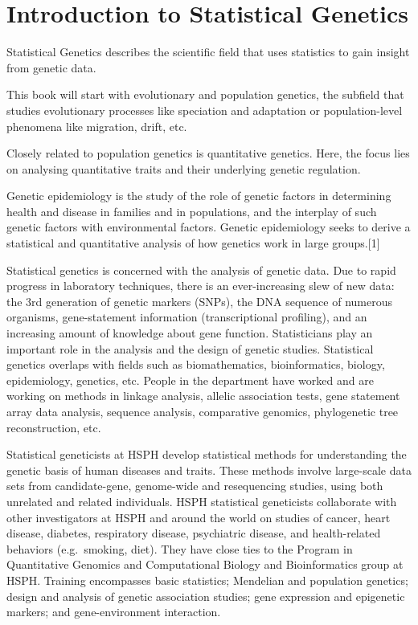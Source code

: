\documentclass[12pt,]{krantz}
\renewenvironment{quote}{\begin{VF}}{\end{VF}}
\theoremstyle{definition}
\theoremstyle{definition}
\theoremstyle{remark}
\begin{document}
\mainmatter

\chapter{Introduction to Statistical
Genetics}\label{introduction-to-statistical-genetics}

Statistical Genetics describes the scientific field that uses statistics
to gain insight from genetic data.

This book will start with evolutionary and population genetics, the
subfield that studies evolutionary processes like speciation and
adaptation or population-level phenomena like migration, drift, etc.

Closely related to population genetics is quantitative genetics. Here,
the focus lies on analysing quantitative traits and their underlying
genetic regulation.

\begin{quote}
Genetic epidemiology is the study of the role of genetic factors in
determining health and disease in families and in populations, and the
interplay of such genetic factors with environmental factors. Genetic
epidemiology seeks to derive a statistical and quantitative analysis of
how genetics work in large groups.{[}1{]}
\end{quote}

\begin{quote}
Statistical genetics is concerned with the analysis of genetic data. Due
to rapid progress in laboratory techniques, there is an ever-increasing
slew of new data: the 3rd generation of genetic markers (SNPs), the DNA
sequence of numerous organisms, gene-statement information
(transcriptional profiling), and an increasing amount of knowledge about
gene function. Statisticians play an important role in the analysis and
the design of genetic studies. Statistical genetics overlaps with fields
such as biomathematics, bioinformatics, biology, epidemiology, genetics,
etc. People in the department have worked and are working on methods in
linkage analysis, allelic association tests, gene statement array data
analysis, sequence analysis, comparative genomics, phylogenetic tree
reconstruction, etc.
\end{quote}

\begin{quote}
Statistical geneticists at HSPH develop statistical methods for
understanding the genetic basis of human diseases and traits. These
methods involve large-scale data sets from candidate-gene, genome-wide
and resequencing studies, using both unrelated and related individuals.
HSPH statistical geneticists collaborate with other investigators at
HSPH and around the world on studies of cancer, heart disease, diabetes,
respiratory disease, psychiatric disease, and health-related behaviors
(e.g.~smoking, diet). They have close ties to the Program in
Quantitative Genomics and Computational Biology and Bioinformatics group
at HSPH. Training encompasses basic statistics; Mendelian and population
genetics; design and analysis of genetic association studies; gene
expression and epigenetic markers; and gene-environment interaction.
\end{quote}
\end{document}

